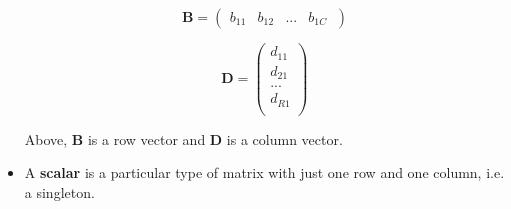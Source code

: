 \documentclass[11pt]{article}
\theoremstyle{definition}
\theoremstyle{remark}
\begin{document}
\begin{itemize}
$$
\textbf{B} =
\begin{pmatrix}
b_{11}&b_{12}&...&b_{1C}\
\end{pmatrix}
$$

$$
\textbf{D} =
\begin{pmatrix}
d_{11}\\
d_{21}\\
...\\
d_{R1}\\
\end{pmatrix}
$$

Above, \textbf{B} is a row vector and \textbf{D} is a column vector.
\item A \textbf{scalar} is a particular type of matrix with just one row and one column, i.e. a singleton.
\end{itemize}

\end{document}
